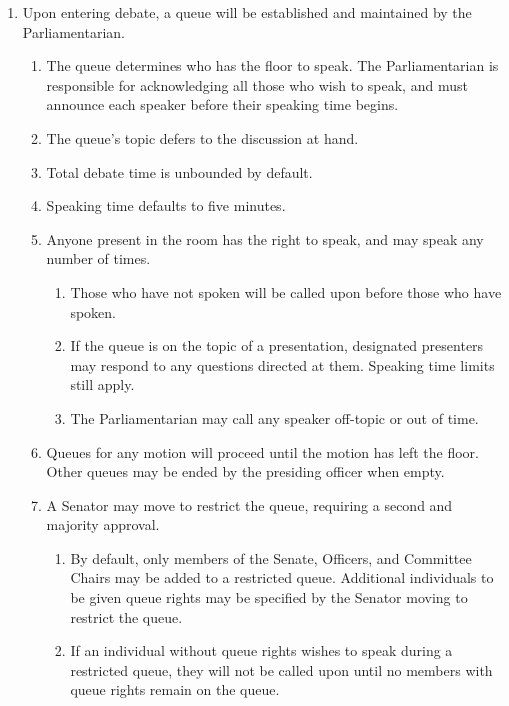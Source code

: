 
\begin{enumerate}

\item Upon entering debate, a queue will be established and maintained by the Parliamentarian.
\begin{enumerate}
\item The queue determines who has the floor to speak. The Parliamentarian is responsible for acknowledging all those who wish
to speak, and must announce each speaker before their speaking time begins.
\item The queue’s topic defers to the discussion at hand.
\item Total debate time is unbounded by default.
\item Speaking time defaults to five minutes.
\item Anyone present in the room has the right to speak, and may speak any number of times.
\begin{enumerate}

\item Those who have not spoken will be called upon before those who have spoken.

\item If the queue is on the topic of a presentation, designated presenters may respond to any questions directed at them.
Speaking time limits still apply.

\item The Parliamentarian may call any speaker off-topic or out of time.

\end{enumerate}\item Queues for any motion will proceed until the motion has left the floor. Other queues may be ended by the presiding officer
when empty.
\item A Senator may move to restrict the queue, requiring a second and majority approval.
\begin{enumerate}
\item By default, only members of the Senate, Officers, and Committee Chairs may be added to a restricted queue.
Additional individuals to be given queue rights may be specified by the Senator moving to restrict the queue.
\item If an individual without queue rights wishes to speak during a restricted queue, they will not be called upon until no
members with queue rights remain on the queue.
\end{enumerate}


\end{enumerate}
\end{enumerate}

